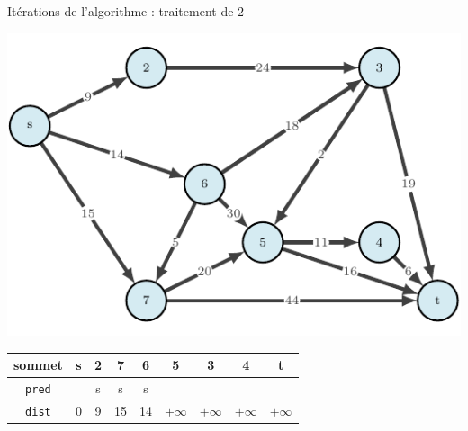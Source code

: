 \begin{frame}{Itérations de l'algorithme : traitement de $2$}
    \begin{center}
        \includegraphics[height=.6\textheight]{fig/ordinal-0.pdf}      
    \begin{tabular}{c|cccccccc}
        
        sommet & s       &2      &7      &6      &5      &3      &4      &t      \\
        \hline
        \texttt{pred} & &s      &s      &s      &       &       &       &       \\
        \texttt{dist} & 0       &9      &15     &14     &$+\infty$    &$+\infty$    &$+\infty$    &$+\infty$    \\
    \end{tabular}
\end{center}
\end{frame}

